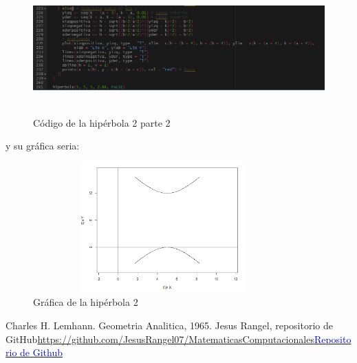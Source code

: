 \documentclass{article}
\begin{document}
\newpage
\begin{figure}[h]
    \centering
    \includegraphics[width=12cm, height=5cm]{Codigohipe4}
    \caption{Código de la hipérbola 2 parte 2}
    \label{fig:mesh21}
\end{figure}
y su gráfica seria:
\begin{figure}[ht]
    \centering
    \includegraphics[width=10cm, height=5cm]{Grafica10}
    \caption{Gráfica de la hipérbola 2}
    \label{fig:mesh22}
\end{figure}



\begin{thebibliography}{0}
   Charles H. Lemhann. Geometria Analitica, 1965.
  Jesus Rangel, repositorio de GitHub\textcolor{blue}{\url{https://github.com/JesusRangel07/MatematicasComputacionales}}\href{https://github.com/JesusRangel07/MatematicasComputacionales}{\textcolor{blue}{Repositorio de Github}}
\end{thebibliography}
\end{document}
